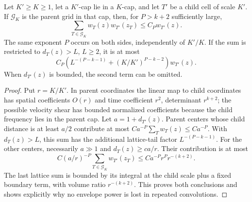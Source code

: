 \begin{lemma}\label{p:convolution}
Let $K'\geq K\geq1$, let a $K'$-cap lie in a $K$-cap, and let $T'$ be a
child cell of scale $K'$.  If $\mathcal G_K$ is the parent grid in that cap,
then, for $P>k+2$ sufficiently large,
\begin{equation}\label{p:convolution-equation}
 \sum_{T\in\mathcal G_K}w_T(z)w_{T'}(z_T)\leq C_Pw_{T'}(z).
\end{equation}
The same exponent $P$ occurs on both sides, independently of $K'/K$.
If the sum is restricted to $d_T(z)>L$, $L\geq2$, it is at most
\begin{equation}\label{p:convolution-tail}
 C_P\left(L^{-(P-k-1)}+(K/K')^{P-k-2}\right)w_{T'}(z).
\end{equation}
When $d_{T'}(z)$ is bounded, the second term can be omitted.
\end{lemma}
\begin{proof}
Put $r=K/K'$.  In parent coordinates the linear map to child coordinates
has spatial coefficients $O(r)$ and time coefficient $r^2$, determinant
$r^{k+2}$; the possible velocity shear has bounded normalized coefficients
because the child frequency lies in the parent cap.  Let
$a=1+d_{T'}(z)$.  Parent centers whose child distance is at least $a/2$
contribute at most
$Ca^{-P}\sum_Tw_T(z)\leq Ca^{-P}$.  With $d_T(z)>L$, this sum has the
additional lattice-tail factor $L^{-(P-k-1)}$.
For the other centers, necessarily $a\gg1$ and $d_T(z)\geq ca/r$.
Their contribution is at most
\[
 C(a/r)^{-P}\sum_{T\in\mathcal G_K}w_{T'}(z_T)
 \leq Ca^{-P}r^P r^{-(k+2)}.
\]
The last lattice sum is bounded by its integral at the child scale plus a
fixed boundary term, with volume ratio $r^{-(k+2)}$.
This proves both conclusions and shows explicitly why no envelope power is
lost in repeated convolutions.
\end{proof}

